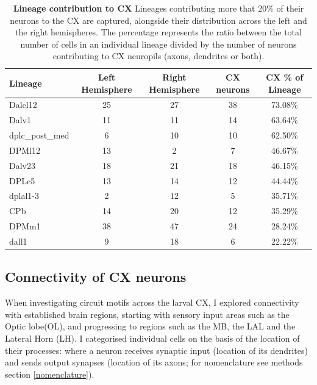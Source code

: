     \begin{table} [!htbp]
    \centering
    \begin{tabular}{|l|c|c|c|c|}
    \hline
    \textbf{Lineage} & \textbf{Left Hemisphere} & \textbf{Right Hemisphere} & \textbf{CX neurons} & \textbf{CX \% of Lineage} \\
    \hline
    Dalcl12 & 25 & 27 & 38 & \cellcolor{forest5}73.08\% \\
    Dalv1 & 11 & 11 & 14 & \cellcolor{forest4}63.64\% \\
    dplc\_post\_med & 6 & 10 & 10 & \cellcolor{forest4}62.50\% \\
    DPMl12 & 13 & 2 & 7 & \cellcolor{forest3}46.67\% \\
    Dalv23 & 18 & 21 & 18 & \cellcolor{forest3}46.15\% \\
    DPLc5 & 13 & 14 & 12 & \cellcolor{forest3}44.44\% \\
    dplal1-3 & 2 & 12 & 5 & \cellcolor{forest2}35.71\% \\
    CPb & 14 & 20 & 12 & \cellcolor{forest2}35.29\% \\
    DPMm1 & 38 & 47 & 24 & \cellcolor{forest1}28.24\% \\
    dall1 & 9 & 18 & 6 & \cellcolor{forest1}22.22\% \\
    \hline
    \end{tabular}
    \caption[Contribution of lineages to CX]{\textbf{Lineage contribution to CX}  Lineages contributing more that 20\% of their neurons to the CX are captured, alongside their distribution across the left and the right hemispheres. The percentage represents the ratio between the total number of cells in an individual lineage divided by the number of neurons contributing to CX neuropils (axons, dendrites or both). }
    \label{cx_percentage}
        \end{table}

    \subsection{Connectivity of CX neurons}
    When investigating circuit motifs across the larval CX, I explored connectivity with established brain regions, starting with sensory input areas such as the Optic lobe(OL), and progressing to regions such as the MB, the LAL and the Lateral Horn (LH).  I categorised individual cells on the basis of the location of their processes: where a neuron receives synaptic input (location of its dendrites) and sends output synapses (location of its axons; for nomenclature see methods section \ref{nomenclature}).

